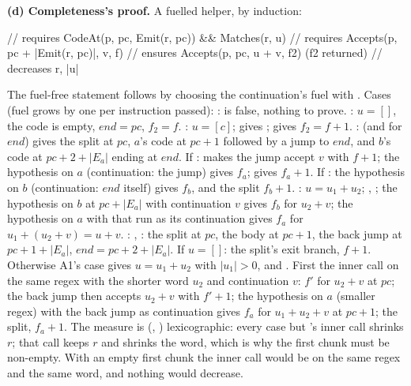 \documentclass[11pt]{article}
\begin{document}
\begin{answer}
\textbf{(d) Completeness's proof.} A fuelled helper, by induction:
\begin{dafnycode}
// requires CodeAt(p, pc, Emit(r, pc)) && Matches(r, u)
// requires Accepts(p, pc + |Emit(r, pc)|, v, f)
// ensures  Accepts(p, pc, u + v, f2)          (f2 returned)
// decreases r, |u|
\end{dafnycode}
The fuel-free statement follows by choosing the continuation's fuel with
\dfy{:|}. Cases (fuel grows by one per instruction passed):
:  is false, nothing to prove. : $u = []$, the
code is empty, $\mathit{end} = pc$, $f_2 = f$. : $u = [c]$;
 gives ;  gives $f_2 = f
+ 1$. :  (and  for
$\mathit{end}$) gives the split at $pc$, $a$'s code at $pc+1$ followed by a
jump to $\mathit{end}$, and $b$'s code at $pc + 2 + |E_a|$ ending at
$\mathit{end}$. If :  makes the jump accept
$v$ with $f + 1$; the hypothesis on $a$ (continuation: the jump) gives $f_a$;
 gives $f_a + 1$. If : the hypothesis on
$b$ (continuation: $\mathit{end}$ itself) gives $f_b$, and the split $f_b + 1$.
: $u = u_1 + u_2$; , ; the
hypothesis on $b$ at $pc + |E_a|$ with continuation $v$ gives $f_b$ for $u_2 +
v$; the hypothesis on $a$ with that run as its continuation gives $f_a$ for
$u_1 + (u_2 + v) = u + v$. : , :
the split at $pc$, the body at $pc + 1$, the back jump  at $pc +
1 + |E_a|$, $\mathit{end} = pc + 2 + |E_a|$. If $u = []$: the split's exit
branch, $f + 1$. Otherwise A1's  case gives $u = u_1 + u_2$ with
$|u_1| > 0$,  and . First the
inner call on the same regex  with the shorter word $u_2$ and
continuation $v$: $f'$ for $u_2 + v$ at $pc$; the back jump then accepts $u_2 +
v$ with $f' + 1$; the hypothesis on $a$ (smaller regex) with the back jump as
continuation gives $f_a$ for $u_1 + u_2 + v$ at $pc + 1$; the split, $f_a + 1$.
The measure is (, ) lexicographic: every case but 's
inner call shrinks $r$; that call keeps $r$ and shrinks the word, which is
why the first chunk must be non-empty. With an empty first chunk the inner call
would be on the same regex and the same word, and nothing would decrease.


\end{answer}
\end{document}

